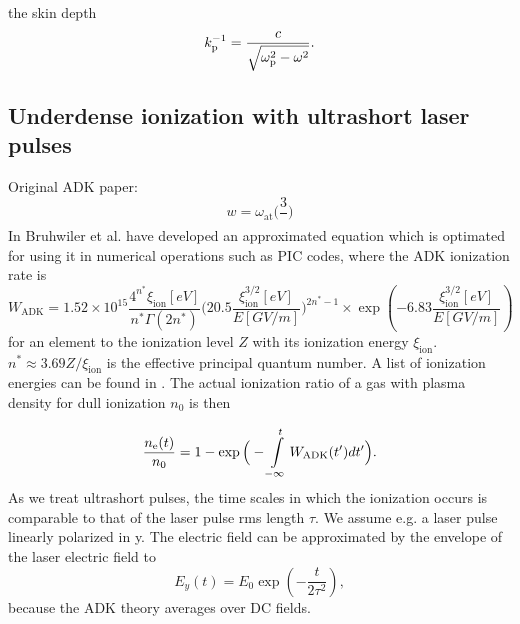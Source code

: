 the skin depth 
\begin{equation}
k_\mathrm{p}^{-1}=\frac{c}{\sqrt{\omega_\mathrm{p}^2-\omega^2}}.
\end{equation}
%
%
%
%




\subsection{Underdense ionization with ultrashort laser pulses}

Original ADK paper: \cite{ADK_original}
\begin{equation}
w=\omega_\mathrm{at}\Big(\frac{3}{} \Big)
\end{equation}
In \cite{bruhwiler2003PoP} Bruhwiler et al. have developed an approximated equation which is optimated for using it in numerical operations such as PIC codes, where the ADK ionization rate is 
\begin{equation}
W_\mathrm{ADK}=1.52\times 10^{15}\frac{4^{n^*}\xi_\mathrm{ion}[eV]}{n^*\Gamma(2n^*)}\Big(20.5\frac{\xi_\mathrm{ion}^{3/2}[eV]}{E[GV/m]}\Big)^{2n^*-1}\times \exp(-6.83\frac{\xi_\mathrm{ion}^{3/2}[eV]}{E[GV/m]})
\label{eqn:ADK_Bruhwiler}
\end{equation}
for an element to the ionization level $Z$ with its ionization energy $\xi_\mathrm{ion}$.
$n^*\approx 3.69Z/\xi_\mathrm{ion}$ is the effective principal quantum number.
A list of ionization energies can be found in \cite{Kelly_1982_Ion_Energies}.
The actual ionization ratio of a gas with plasma density for dull ionization $n_0$ is then

\begin{equation}
\frac{n_\mathrm{e}(t)}{n_0} =1-\exp\Big(-\int \limits_{-\infty}^t W_\mathrm{ADK}(t')dt'\Big).
\end{equation}
As we treat ultrashort pulses, the time scales in which the ionization occurs is comparable to that of the laser pulse rms length $\tau$. We assume e.g. a laser pulse linearly polarized in y. 
The electric field can be approximated by the envelope of the laser electric field to 
\begin{equation}
E_{y}(t)=E_0\exp(-\frac{t}{2\tau^2}),
\end{equation}
because the ADK theory averages over DC fields.

